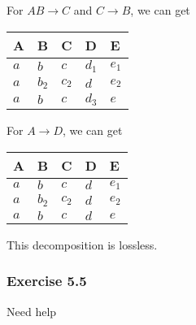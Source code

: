 \documentclass[../../main.tex]{subfiles}
\begin{document}
For $AB \to C$ and $C \to B$, we can get

\begin{table}[H]
  \centering
  \begin{tabular}{@{}lllll@{}}
  \toprule
  A & B & C & D & E \\ \midrule
  $a$     & $b$      & $c$     & $d_{1}$ & $e_{1}$  \\
  $a$     & $b_{2}$  & $c_{2}$ & $d$     & $e_{2}$  \\
  $a$     & $b$      & $c$     & $d_{3}$ & $e$      \\ \bottomrule
  \end{tabular}
\end{table}

For $A \to D$, we can get

\begin{table}[H]
  \centering
  \begin{tabular}{@{}lllll@{}}
  \toprule
  A & B & C & D & E \\ \midrule
  $a$     & $b$      & $c$     & $d$ & $e_{1}$  \\
  $a$     & $b_{2}$  & $c_{2}$ & $d$ & $e_{2}$  \\
  $a$     & $b$      & $c$     & $d$ & $e$      \\ \bottomrule
  \end{tabular}
\end{table}

This decomposition is lossless.

\subsubsection*{Exercise 5.5}

Need help
\end{document}
